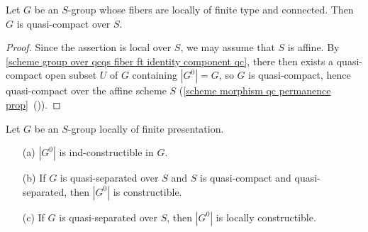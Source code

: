 \begin{corollary}\label{scheme group fiber ft connected is qc}
Let $G$ be an $S$-group whose fibers are locally of finite type and connected. Then $G$ is quasi-compact over $S$.
\end{corollary}
\begin{proof}
Since the assertion is local over $S$, we may assume that $S$ is affine. By \cref{scheme group over qcqs fiber ft identity component qc}, there then exists a quasi-compact open subset $U$ of $G$ containing $|G^0|=G$, so $G$ is quasi-compact, hence quasi-compact over the affine scheme $S$ (\cref{scheme morphism qc permanence prop}~()).
\end{proof}

\begin{proposition}\label{scheme group local fp |G^0| constructible prop}
Let $G$ be an $S$-group locally of finite presentation.
\begin{enumerate}
    \item[(a)] $|G^0|$ is ind-constructible in $G$.
    \item[(b)] If $G$ is quasi-separated over $S$ and $S$ is quasi-compact and quasi-separated, then $|G^0|$ is constructible.
    \item[(c)] If $G$ is quasi-separated over $S$, then $|G^0|$ is locally constructible. 
\end{enumerate}
\end{proposition}
